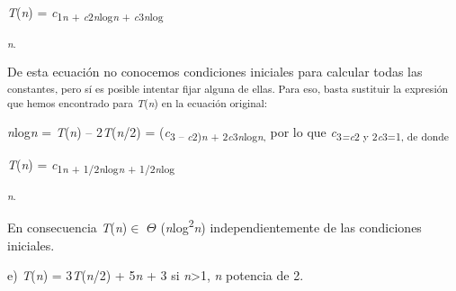 \documentclass[12pt]{article}
\renewcommand{\_}{\kern-1.5pt\textunderscore\kern-1.5pt}
\begin{document}
\begin{adjustwidth}{0.58in}{0.57in}
\begin{Center}
{\fontsize{10pt}{12.0pt}\selectfont \textit{T}(\textit{n}) = \textit{c}\textsubscript{1\textit{n }+ \textit{c}2\textit{n}log\textit{n }+ \textit{c}3\textit{n}log}{\fontsize{7pt}{8.4pt}\textit{\textsubscript{n}}\textsubscript{. }{\fontsize{10pt}{12.0pt}\selectfont De esta ecuación no conocemos condiciones iniciales para calcular todas las \textsubscript{constantes, pero sí es posible intentar fijar alguna de ellas. Para eso, basta sustituir la expresión que hemos encontrado para \textit{T}(\textit{n}) en la ecuación original: }\par}\par}\par}
\end{Center}\par

\end{adjustwidth}

\begin{adjustwidth}{0.58in}{1.7in}
{\fontsize{10pt}{12.0pt}\selectfont \textit{n}log\textit{n }= \textit{T}(\textit{n}) – 2\textit{T}(\textit{n}/2) = (\textit{c}\textsubscript{3 – \textit{c}2)\textit{n }+ 2\textit{c}3\textit{n}log\textit{n}, }por lo que \textit{c}\textsubscript{3\textit{=c}2 y 2\textit{c}3=1, de donde }\par}\par

\end{adjustwidth}

\begin{adjustwidth}{0.58in}{0.63in}
\begin{Center}
{\fontsize{10pt}{12.0pt}\selectfont \textit{T}(\textit{n}) = \textit{c}\textsubscript{1\textit{n }+ 1/2\textit{n}log\textit{n }+ 1/2\textit{n}log}{\fontsize{7pt}{8.4pt}\textit{\textsubscript{n}}\textsubscript{. }{\fontsize{10pt}{12.0pt}\selectfont En consecuencia \textit{T}(\textit{n})$ \in $ $ \Theta $ (\textit{n}log\textsuperscript{2}\textit{n}) independientemente de las condiciones iniciales. \par}\par}\par}
\end{Center}\par

\end{adjustwidth}

\begin{adjustwidth}{0.58in}{2.63in}
{\fontsize{10pt}{12.0pt}\selectfont e) \textit{T}(\textit{n}) = 3\textit{T}(\textit{n}/2) + 5\textit{n }+ 3 si \textit{n}>1, \textit{n }potencia de 2. \par}\par

\end{adjustwidth}
\end{document}

